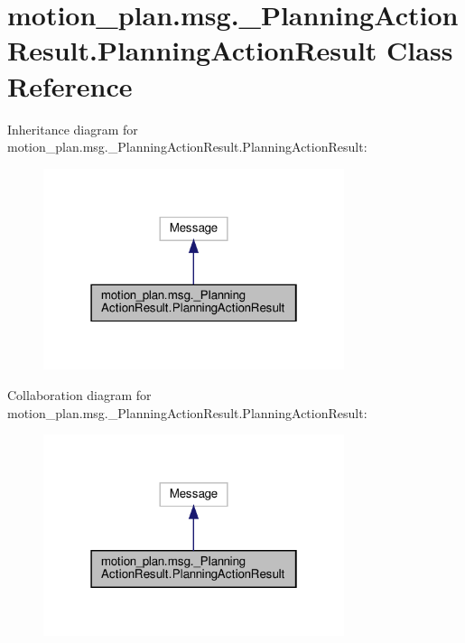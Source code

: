 \hypertarget{classmotion__plan_1_1msg_1_1__PlanningActionResult_1_1PlanningActionResult}{}\section{motion\+\_\+plan.\+msg.\+\_\+\+Planning\+Action\+Result.\+Planning\+Action\+Result Class Reference}
\label{classmotion__plan_1_1msg_1_1__PlanningActionResult_1_1PlanningActionResult}


Inheritance diagram for motion\+\_\+plan.\+msg.\+\_\+\+Planning\+Action\+Result.\+Planning\+Action\+Result\+:
\nopagebreak
\begin{figure}[H]
\begin{center}
\leavevmode
\includegraphics[width=250pt]{classmotion__plan_1_1msg_1_1__PlanningActionResult_1_1PlanningActionResult__inherit__graph}
\end{center}
\end{figure}


Collaboration diagram for motion\+\_\+plan.\+msg.\+\_\+\+Planning\+Action\+Result.\+Planning\+Action\+Result\+:
\nopagebreak
\begin{figure}[H]
\begin{center}
\leavevmode
\includegraphics[width=250pt]{classmotion__plan_1_1msg_1_1__PlanningActionResult_1_1PlanningActionResult__coll__graph}
\end{center}
\end{figure}
